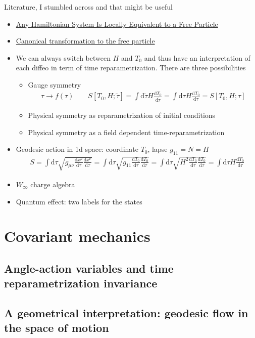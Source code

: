 \documentclass[onecolumn,notitlepage,superscriptaddress, nofootinbib,nobibnotes, aps,prd,10pt]{revtex4-1}%
\def\be{\begin{eqnarray}}
\def\ee{\end{eqnarray}}
\def\dd{\mathrm{d}}
\begin{document}
Literature, I stumbled across and that might be useful
\begin{itemize}
    \item \href{https://www.scirp.org/html/23892.html}{Any Hamiltonian System Is Locally Equivalent to a Free Particle}
    \item \href{https://sci-hub.ru/https://doi.org/10.1119/1.10618}{Canonical transformation to the free particle}
    \item We can always switch between $H$ and $T_0$ and thus have an interpretation of each diffeo in term of time reparametrization. There are three possibilities
    \begin{itemize}
    \item Gauge symmetry
    \be
    \tau \rightarrow f(\tau) \qquad S[T_0 ,H; \tilde{\tau}] = \int \dd{  \tilde{\tau} }H \frac{\dd{T_0}}{\dd{ \tilde{\tau}}} = \int \dd{ \tau }H \frac{\dd{T_0}}{\dd{ \tau}} = S[T_0 ,H; \tau]
    \ee
    \item Physical symmetry as reparametrization of initial conditions
    \item Physical symmetry as a field dependent time-reparametrization
    \end{itemize}
    \item Geodesic action in 1d space: coordinate $T_0$, lapse $g_{11} = N=H$
    \be
    S = \int \dd{\tau} \sqrt{g_{\mu\nu} \frac{\dd{ x^{\mu}}}{\dd{ \tau}} \frac{\dd{ x^{\nu}}}{\dd{ \tau} }} =  \int \dd{\tau} \sqrt{g_{11} \frac{\dd{ T_0}}{\dd{ \tau}} \frac{\dd{ T_0}}{\dd{ \tau} }} =  \int \dd{\tau} \sqrt{H^2 \frac{\dd{ T_0}}{\dd{ \tau}} \frac{\dd{ T_0}}{\dd{ \tau} }} =  \int \dd{\tau} H\frac{\dd{ T_0}}{\dd{ \tau}} 
    \ee
    \item $W_{\infty}$ charge algebra
    \item Quantum effect: two labels for the states
\end{itemize}

\newpage

\section{Covariant mechanics}

\subsection{Angle-action variables and time reparametrization invariance}

\subsection{A geometrical interpretation: geodesic flow in the space of motion}
\end{document}
